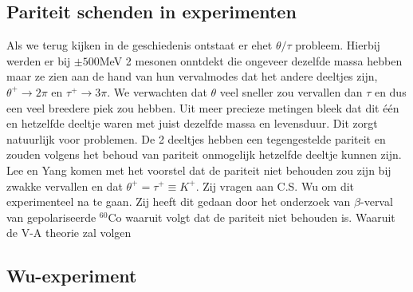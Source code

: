 \documentclass[../main.tex]{subfiles}
\begin{document}
\subsection{Pariteit schenden in experimenten}%
\label{sub:pariteit_schenden_in_experimenten}

Als we terug kijken in de geschiedenis ontstaat er ehet $\theta/\tau$ probleem. Hierbij werden er bij $\pm500$MeV 2 mesonen onntdekt die ongeveer dezelfde massa hebben maar ze zien aan de hand van hun vervalmodes dat het andere deeltjes zijn, $\theta^+\rightarrow 2\pi$ en $\tau^+\rightarrow 3\pi$. We verwachten dat $\theta$ veel sneller zou vervallen dan $\tau$ en dus een veel breedere piek zou hebben. Uit meer precieze metingen bleek dat dit één en hetzelfde deeltje waren met juist dezelfde massa en levensduur. Dit zorgt natuurlijk voor problemen. De 2 deeltjes hebben een tegengestelde pariteit en zouden volgens het behoud van pariteit onmogelijk hetzelfde deeltje kunnen zijn. Lee en Yang komen met het voorstel dat de pariteit niet behouden zou zijn bij zwakke vervallen en dat $\theta^+ = \tau^+ \equiv K^+$. Zij vragen aan C.S. Wu om dit experimenteel na te gaan. Zij heeft dit gedaan door het onderzoek van $\beta$-verval van gepolariseerde $^{60}$Co waaruit volgt dat de pariteit niet behouden is. Waaruit de V-A theorie zal volgen

\subsection{Wu-experiment}%
\label{sub:wu_experiment}
\end{document}
